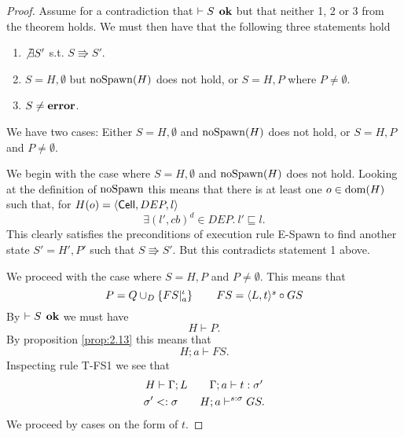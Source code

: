 \begin{proof}
  Assume for a contradiction that $\vdash S \:\: \mbox{\bf ok}$ but that neither 1,
  2 or 3 from the theorem holds. We must then have that the following three
  statements hold
  \begin{enumerate}
    \item $\not\exists S'$ s.t. $S \Rrightarrow S'$.
    \item $S = H, \emptyset$ but $\mbox{$\mathrm{noSpawn}$}(H)$ does not hold, or $S = H, P$
      where $P \neq \emptyset$.
    \item $S \neq \mbox{{\bf error}}$.
  \end{enumerate}
  We have two cases: Either $S = H, \emptyset$ and $\mbox{$\mathrm{noSpawn}$}(H)$ does not hold,
  or $S = H, P$ and $P \neq \emptyset$.

  We begin with the case where $S = H, \emptyset$ and $\mbox{$\mathrm{noSpawn}$}(H)$ does not
  hold. Looking at the definition of $\mbox{$\mathrm{noSpawn}$}$ this means that there is at
  least one $o \in \mbox{$\mathrm{dom}$}(H)$ such that, for $H(o) = \mbox{$\langle \mbox{$\mathsf{Cell}$}{}, DEP, l \rangle$}$
  \begin{equation*}
    \exists (l', cb)^d \in DEP. \: l' \sqsubseteq l.
  \end{equation*}
  This clearly satisfies the preconditions of execution rule {\sc E-Spawn} to
  find another state $S' = H', P'$ such that $S \Rrightarrow S'$. But this
  contradicts statement 1 above.

  We proceed with the case where $S = H, P$ and $P \neq \emptyset$. This means
  that
  \begin{equation*}
    P = Q \cup_D \left\{ FS|_a^\iota \right\} \quad\quad FS = \mbox{$\langle L, t \rangle^s$} \circ GS
  \end{equation*}
  By $\vdash S \:\: \mbox{\bf ok}$ we must have
  \begin{equation*}
    H \vdash P.
  \end{equation*}
  By proposition \ref{prop:2.13} this means that 
  \begin{equation*}
    H;a \vdash FS.
  \end{equation*}
  Inspecting rule {\sc T-FS1} we see that
  \begin{equation} \label{eq:prog_tbase}
    \begin{gathered}
      H \vdash \Gamma;L \quad\quad \mbox{$\Gamma;a\vdash t:\sigma'$} \\
      \sigma' <: \sigma \quad\quad H;a \vdash^{s: \sigma} GS.
    \end{gathered}
  \end{equation}
  We proceed by cases on the form of $t$. 
  

\end{proof}
